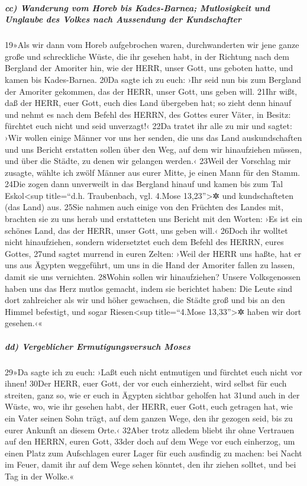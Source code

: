 \hypertarget{cc-wanderung-vom-horeb-bis-kades-barnea-mutlosigkeit-und-unglaube-des-volkes-nach-aussendung-der-kundschafter}{%
\subparagraph{cc) Wanderung vom Horeb bis Kades-Barnea; Mutlosigkeit und
Unglaube des Volkes nach Aussendung der
Kundschafter}\label{cc-wanderung-vom-horeb-bis-kades-barnea-mutlosigkeit-und-unglaube-des-volkes-nach-aussendung-der-kundschafter}}

19»Als wir dann vom Horeb aufgebrochen waren, durchwanderten wir jene
ganze große und schreckliche Wüste, die ihr gesehen habt, in der
Richtung nach dem Bergland der Amoriter hin, wie der HERR, unser Gott,
uns geboten hatte, und kamen bis Kades-Barnea. 20Da sagte ich zu euch:
›Ihr seid nun bis zum Bergland der Amoriter gekommen, das der HERR,
unser Gott, uns geben will. 21Ihr wißt, daß der HERR, euer Gott, euch
dies Land übergeben hat; so zieht denn hinauf und nehmt es nach dem
Befehl des HERRN, des Gottes eurer Väter, in Besitz: fürchtet euch nicht
und seid unverzagt!‹ 22Da tratet ihr alle zu mir und sagtet: ›Wir wollen
einige Männer vor uns her senden, die uns das Land auskundschaften und
uns Bericht erstatten sollen über den Weg, auf dem wir hinaufziehen
müssen, und über die Städte, zu denen wir gelangen werden.‹ 23Weil der
Vorschlag mir zusagte, wählte ich zwölf Männer aus eurer Mitte, je einen
Mann für den Stamm. 24Die zogen dann unverweilt in das Bergland hinauf
und kamen bis zum Tal Eskol\textless sup title=``d.h. Traubenbach, vgl.
4.Mose 13,23''\textgreater✲ und kundschafteten (das Land) aus. 25Sie
nahmen auch einige von den Früchten des Landes mit, brachten sie zu uns
herab und erstatteten uns Bericht mit den Worten: ›Es ist ein schönes
Land, das der HERR, unser Gott, uns geben will.‹ 26Doch ihr wolltet
nicht hinaufziehen, sondern widersetztet euch dem Befehl des HERRN,
eures Gottes, 27und sagtet murrend in euren Zelten: ›Weil der HERR uns
haßte, hat er uns aus Ägypten weggeführt, um uns in die Hand der
Amoriter fallen zu lassen, damit sie uns vernichten. 28Wohin sollen wir
hinaufziehen? Unsere Volksgenossen haben uns das Herz mutlos gemacht,
indem sie berichtet haben: Die Leute sind dort zahlreicher als wir und
höher gewachsen, die Städte groß und bis an den Himmel befestigt, und
sogar Riesen\textless sup title=``4.Mose 13,33''\textgreater✲ haben wir
dort gesehen.‹«

\hypertarget{dd-vergeblicher-ermutigungsversuch-moses}{%
\subparagraph{dd) Vergeblicher Ermutigungsversuch
Moses}\label{dd-vergeblicher-ermutigungsversuch-moses}}

29»Da sagte ich zu euch: ›Laßt euch nicht entmutigen und fürchtet euch
nicht vor ihnen! 30Der HERR, euer Gott, der vor euch einherzieht, wird
selbst für euch streiten, ganz so, wie er euch in Ägypten sichtbar
geholfen hat 31und auch in der Wüste, wo, wie ihr gesehen habt, der
HERR, euer Gott, euch getragen hat, wie ein Vater seinen Sohn trägt, auf
dem ganzen Wege, den ihr gezogen seid, bis zu eurer Ankunft an diesem
Orte.‹ 32Aber trotz alledem bliebt ihr ohne Vertrauen auf den HERRN,
euren Gott, 33der doch auf dem Wege vor euch einherzog, um einen Platz
zum Aufschlagen eurer Lager für euch ausfindig zu machen: bei Nacht im
Feuer, damit ihr auf dem Wege sehen könntet, den ihr ziehen solltet, und
bei Tag in der Wolke.«

